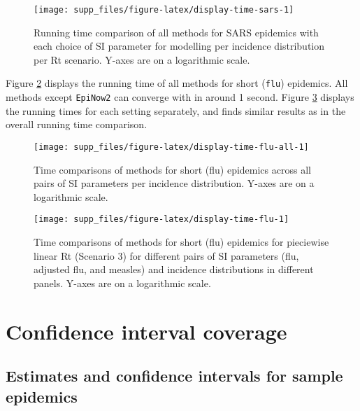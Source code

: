 \documentclass[
]{article}
\begin{document}
\begin{figure}[!ht]

{\centering \texttt{[image: supp\_files/figure-latex/display-time-sars-1]} 

}

\caption{Running time comparison of all methods for SARS epidemics with each choice of SI parameter for modelling per incidence distribution per Rt scenario. Y-axes are on a logarithmic scale.}\label{fig:display-time-sars}
\end{figure}

Figure \ref{fig:display-time-flu-all} displays the running time of all methods
for short (\texttt{flu}) epidemics. All methods except \texttt{EpiNow2} can converge with in
around 1 second. Figure \ref{fig:display-time-flu} displays
the running times for each setting separately, and finds similar results as in
the overall running time comparison.

\begin{figure}[!ht]

{\centering \texttt{[image: supp\_files/figure-latex/display-time-flu-all-1]} 

}

\caption{Time comparisons of methods for short (flu) epidemics across all pairs of SI parameters per incidence distribution. Y-axes are on a logarithmic scale.}\label{fig:display-time-flu-all}
\end{figure}

\begin{figure}[!ht]

{\centering \texttt{[image: supp\_files/figure-latex/display-time-flu-1]} 

}

\caption{Time comparisons of methods for short (flu) epidemics for pieciewise linear Rt (Scenario 3) for different pairs of SI parameters (flu, adjusted flu, and measles) and incidence distributions in different panels. Y-axes are on a logarithmic scale.}\label{fig:display-time-flu}
\end{figure}

\clearpage

\section{Confidence interval coverage}\label{confidence-interval-coverage}

\subsection{Estimates and confidence intervals for sample epidemics}\label{sec:samples}
\end{document}
